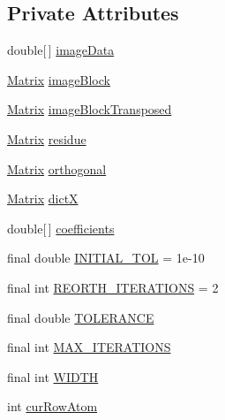 \subsection*{Private Attributes}
\begin{DoxyCompactItemize}
\item 
double\mbox{[}$\,$\mbox{]} \hyperlink{classOMP2D_1_1OMP2D_aa03b270daab3c9ade9073fbb23032a22}{image\-Data}
\item 
\hyperlink{classOMP2D_1_1Matrix}{Matrix} \hyperlink{classOMP2D_1_1OMP2D_a17850fb16a9721bfbb92db8ea8848215}{image\-Block}
\item 
\hyperlink{classOMP2D_1_1Matrix}{Matrix} \hyperlink{classOMP2D_1_1OMP2D_a249a4c8483ae447b2b88d47ea6ed6f9c}{image\-Block\-Transposed}
\item 
\hyperlink{classOMP2D_1_1Matrix}{Matrix} \hyperlink{classOMP2D_1_1OMP2D_a2f1ff4422989fc543c1f6f562b8b05fc}{residue}
\item 
\hyperlink{classOMP2D_1_1Matrix}{Matrix} \hyperlink{classOMP2D_1_1OMP2D_a312e46e55e779f578a7b17f071bed5a9}{orthogonal}
\item 
\hyperlink{classOMP2D_1_1Matrix}{Matrix} \hyperlink{classOMP2D_1_1OMP2D_a8836c70cb96a019f86ff8d41d4b3a3f6}{dict\-X}
\item 
double\mbox{[}$\,$\mbox{]} \hyperlink{classOMP2D_1_1OMP2D_a8af5ef6c4d66d21558f3a61dc6b80bdc}{coefficients}
\item 
final double \hyperlink{classOMP2D_1_1OMP2D_ae838e473d8b5653fd07ed72a46389cd5}{I\-N\-I\-T\-I\-A\-L\-\_\-\-T\-O\-L} = 1e-\/10
\item 
final int \hyperlink{classOMP2D_1_1OMP2D_a704206f085ba68939282448f2c1eacd4}{R\-E\-O\-R\-T\-H\-\_\-\-I\-T\-E\-R\-A\-T\-I\-O\-N\-S} = 2
\item 
final double \hyperlink{classOMP2D_1_1OMP2D_a5fe5837116b58dfb22450c0dc72dab41}{T\-O\-L\-E\-R\-A\-N\-C\-E}
\item 
final int \hyperlink{classOMP2D_1_1OMP2D_a48452fd4f5fb84d49a108d233a1be40e}{M\-A\-X\-\_\-\-I\-T\-E\-R\-A\-T\-I\-O\-N\-S}
\item 
final int \hyperlink{classOMP2D_1_1OMP2D_ac885e11e3f91b4a1c2d7c4b997d48047}{W\-I\-D\-T\-H}
\item 
int \hyperlink{classOMP2D_1_1OMP2D_a31148a069e4786564b9490f56e5d0288}{cur\-Row\-Atom}
\end{DoxyCompactItemize}



